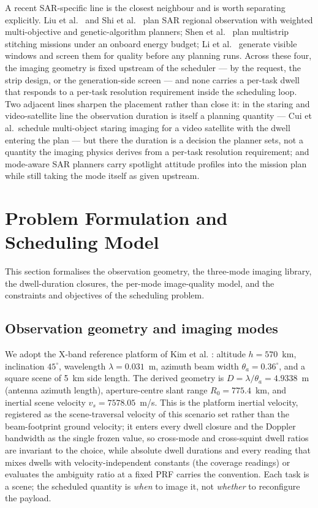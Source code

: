 \documentclass[preprint,authoryear]{elsarticle}
\begin{document}
A recent SAR-specific line is the closest neighbour and is worth separating explicitly. Liu et al.~\citep{liu2025a} and Shi et al.~\citep{xin2024sar} plan SAR regional observation with weighted multi-objective and genetic-algorithm planners; Shen et al.~\citep{shen2024multistrip} plan multistrip stitching missions under an onboard energy budget; Li et al.~\citep{li2026efficient} generate visible windows and screen them for quality before any planning runs. Across these four, the imaging geometry is fixed upstream of the scheduler --- by the request, the strip design, or the generation-side screen --- and none carries a per-task dwell that responds to a per-task resolution requirement inside the scheduling loop. Two adjacent lines sharpen the placement rather than close it: in the staring and video-satellite line the observation duration is itself a planning quantity --- Cui et al.\ schedule multi-object staring imaging for a video satellite with the dwell entering the plan \citep{cui2018mission} --- but there the duration is a decision the planner sets, not a quantity the imaging physics derives from a per-task resolution requirement; and mode-aware SAR planners carry spotlight attitude profiles into the mission plan \citep{kim2020optimal} while still taking the mode itself as given upstream.

\section{Problem Formulation and Scheduling Model}\label{sec:model}

This section formalises the observation geometry, the three-mode imaging library, the dwell-duration closures, the per-mode image-quality model, and the constraints and objectives of the scheduling problem.

\subsection{Observation geometry and imaging modes}\label{sec:geometry}

We adopt the X-band reference platform of Kim et al. \citep{kim2021optimal}: altitude $h=570$~km, inclination $45^{\circ}$, wavelength $\lambda=0.031$~m, azimuth beam width $\theta_a=0.36^{\circ}$, and a square scene of 5~km side length. The derived geometry is $D=\lambda/\theta_a=4.9338$~m (antenna azimuth length), aperture-centre slant range $R_0=775.4$~km, and inertial scene velocity $v_s=7578.05$~m/s. This is the platform inertial velocity, registered as the scene-traversal velocity of this scenario set rather than the beam-footprint ground velocity; it enters every dwell closure and the Doppler bandwidth as the single frozen value, so cross-mode and cross-squint dwell ratios are invariant to the choice, while absolute dwell durations and every reading that mixes dwells with velocity-independent constants (the coverage readings) or evaluates the ambiguity ratio at a fixed PRF carries the convention. Each task is a scene; the scheduled quantity is \emph{when} to image it, not \emph{whether} to reconfigure the payload.
\end{document}
